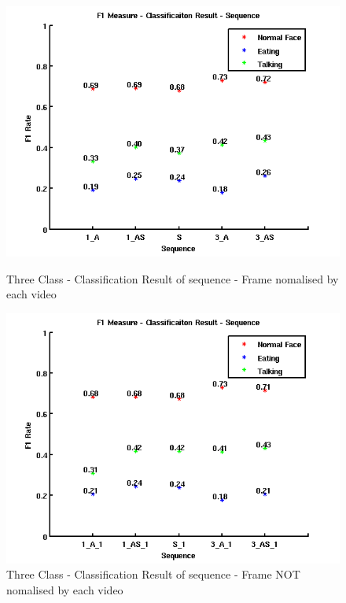 \begin{figure}[ht]
\centering
\begin{minipage}{.5\textwidth}
  \centering
  \captionsetup{justification=centering,margin=1cm}
  \includegraphics[width=\linewidth]{imgs/Result_F1_Sequence.png}
  \caption{Three Class - Classification Result of sequence - Frame nomalised by each video}
  \label{fig:RFS}
\end{minipage}%
\begin{minipage}{.5\textwidth}
  \centering
  \captionsetup{justification=centering,margin=1cm}
  \includegraphics[width=\linewidth]{imgs/Result_F1_Sequence_1.png}
  \caption{Three Class - Classification Result of sequence - Frame NOT nomalised by each video}
  \label{fig:RFS1}
\end{minipage}
\end{figure}
